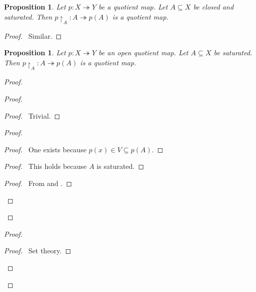 \documentclass{report}
\let\qed\relax
\newtheorem{prop}[lm]{Proposition}
\theoremstyle{definition}
\begin{document}
  \begin{prop}
    Let $p : X \twoheadrightarrow Y$ be a quotient map. Let $A \subseteq X$ be
    closed and saturated. Then $p \restriction_A : A \twoheadrightarrow p(A)$
    is
    a
    quotient map.
  \end{prop}

  \begin{proof}
    \pf\ Similar. \qed
  \end{proof}

  \begin{prop}
    Let $p : X \twoheadrightarrow Y$ be an open quotient map. Let $A \subseteq
    X$ be
    saturated. Then $p \restriction_A : A \twoheadrightarrow p(A)$ is a
    quotient map.
  \end{prop}

  \begin{proof}
    \pf
    \begin{proof}
      \begin{proof}
        \pf\ Trivial.
      \end{proof}
      \begin{proof}
        \begin{proof}
          \pf\ One exists because $p(x) \in V \subseteq p(A)$.
        \end{proof}
        \begin{proof}
          \pf\ This holds because $A$ is saturated.
        \end{proof}
        \begin{proof}
          \pf\ From  and .
        \end{proof}
      \end{proof}
    \end{proof}
    \begin{proof}
      \begin{proof}
        \pf\ Set theory.
      \end{proof}

\end{proof}
\end{proof}
\end{document}
